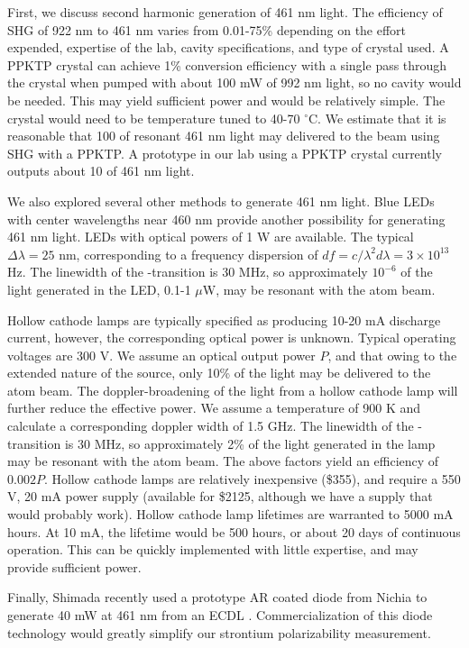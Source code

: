 First, we discuss second harmonic generation of 461 nm light. The efficiency of SHG of 922 nm to 461 nm varies from 0.01-75\% \cite{Van06,Tar05} depending on the effort expended, expertise of the lab, cavity specifications, and type of crystal used. A PPKTP crystal can achieve 1\% conversion efficiency with a single pass through the crystal when pumped with about 100 mW of 992 nm light, so no cavity would be needed. This may yield sufficient power and would be relatively simple. The crystal would need to be temperature tuned to 40-70 $^\circ$C. We estimate that it is reasonable that 100 \muW of resonant 461 nm light may delivered to the beam using SHG with a PPKTP. A prototype in our lab using a PPKTP crystal currently outputs about 10 \muW of 461 nm light.


We also explored several other methods to generate 461 nm light. Blue LEDs with center wavelengths near 460 nm provide another possibility for generating 461 nm light. LEDs with optical powers of 1 W are available. The typical $\Delta\lambda=25$ nm, corresponding to a frequency dispersion of $df=c/\lambda^2d\lambda=3\times10^{13}$ Hz. The linewidth of the \sSz-\sPo transition is 30 MHz, so approximately $10^{-6}$ of the light generated in the LED, 0.1-1 $\mu$W, may be resonant with the atom beam. 


Hollow cathode lamps are typically specified as producing 10-20 mA discharge current, however, the corresponding optical power is unknown. Typical operating voltages are 300 V. We assume an optical output power $P$, and that owing to the extended nature of the source, only 10\% of the light may be delivered to the atom beam. The doppler-broadening of the light from a hollow cathode lamp will further reduce the effective power. We assume a temperature of 900 K and calculate a corresponding doppler width of 1.5 GHz. The linewidth of the \sSz-\sPo transition is 30 MHz, so approximately 2\% of the light generated in the lamp may be resonant with the atom beam. The above factors yield an efficiency of $0.002P$. Hollow cathode lamps are relatively inexpensive (\$355), and require a 550 V, 20 mA power supply (available for \$2125, although we have a supply that would probably work). Hollow cathode lamp lifetimes are warranted to 5000 mA hours. At 10 mA, the lifetime would be 500 hours, or about 20 days of continuous operation. This can be quickly implemented with little expertise, and may provide sufficient power. 


Finally, Shimada \etal recently used a prototype AR coated diode from Nichia to generate 40 mW at 461 nm from an ECDL \cite{Shi13}. Commercialization of this diode technology would greatly simplify our strontium polarizability measurement.





